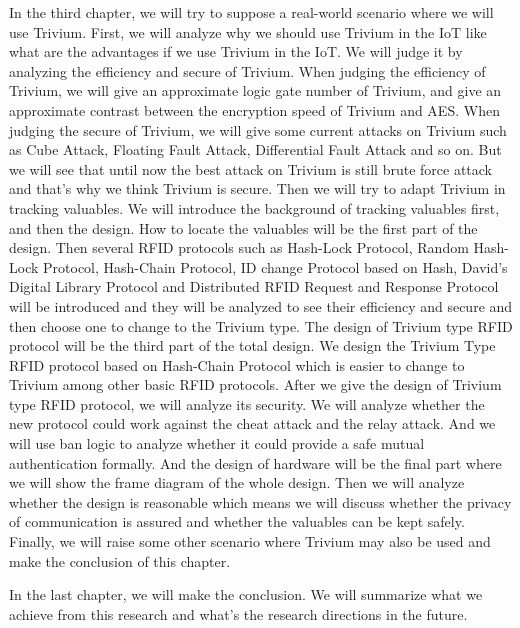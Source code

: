 \begin{bigabstract}
In the third chapter, we will try to suppose a real-world scenario where we will use Trivium. First, we will analyze why we should use Trivium in the IoT like what are the advantages if we use Trivium in the IoT. We will judge it by analyzing the efficiency and secure of Trivium. When judging the efficiency of Trivium, we will give an approximate logic gate number of Trivium, and give an approximate contrast between the encryption speed of Trivium and AES. When judging the secure of Trivium, we will give some current attacks on Trivium such as Cube Attack, Floating Fault Attack, Differential Fault Attack and so on. But we will see that until now the best attack on Trivium is still brute force attack and that’s why we think Trivium is secure. Then we will try to adapt Trivium in tracking valuables. We will introduce the background of tracking valuables first, and then the design. How to locate the valuables will be the first part of the design. Then several RFID protocols such as Hash-Lock Protocol, Random Hash-Lock Protocol, Hash-Chain Protocol, ID change Protocol based on Hash, David's Digital Library Protocol and Distributed RFID Request and Response Protocol will be introduced and they will be analyzed to see their efficiency and secure and then choose one to change to the Trivium type. The design of Trivium type RFID protocol will be the third part of the total design. We design the Trivium Type RFID protocol based on Hash-Chain Protocol which is easier to change to Trivium among other basic RFID protocols. After we give the design of Trivium type RFID protocol, we will analyze its security. We will analyze whether the new protocol could work against the cheat attack and the relay attack. And we will use ban logic to analyze whether it could provide a safe mutual authentication formally. And the design of hardware will be the final part where we will show the frame diagram of the whole design. Then we will analyze whether the design is reasonable which means we will discuss whether the privacy of communication is assured and whether the valuables can be kept safely. Finally, we will raise some other scenario where Trivium may also be used and make the conclusion of this chapter.

In the last chapter, we will make the conclusion. We will summarize what we achieve from this research and what’s the research directions in the future.

\end{bigabstract}